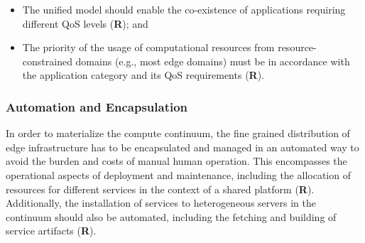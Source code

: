 \begin{itemize}
	\item The unified model should enable the co-existence of applications requiring different QoS levels (\textbf{R}); and
	
	\item The priority of the usage of computational resources from resource-constrained domains (e.g., most edge domains) must be in accordance with the application category and its QoS requirements (\textbf{R}).
\end{itemize}


\subsubsection*{Automation and Encapsulation}


In order to materialize the compute continuum, the fine grained distribution of edge infrastructure has to be encapsulated and managed in an automated way to avoid the burden and costs of manual human operation. This encompasses the operational aspects of deployment and maintenance, including the allocation of resources for different services in the context of a shared platform (\textbf{R}). 
Additionally, the installation of services to heterogeneous servers in the continuum should also be automated, including the fetching and building of service artifacts (\textbf{R}).









